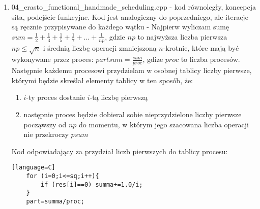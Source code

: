 \documentclass[12pt]{article}
\begin{document}
\begin {enumerate}
\begin{enumerate}
	\end{enumerate}
	\item 04\_erasto\_functional\_handmade\_scheduling.cpp - kod równoległy, koncepcja sita, podejście funkcyjne. Kod jest analogiczny do poprzedniego, ale iteracje są ręcznie przypisywane do każdego wątku - Najpierw wyliczam sumę \(sum=\frac{1}{2}+\frac{1}{3}+\frac{1}{5}+\frac{1}{7}+...+\frac{1}{np}\), gdzie \(np\) to najwyższa liczba pierwsza \(np\le\sqrt{n}\)  i średnią liczbę operacji zmniejszoną \(n\)-krotnie, które mają być wykonywane przez proces: \(partsum=\frac{sum}{proc}\), gdize \(proc\) to liczba procesów. Następnie każdemu procesowi przydzielam w osobnej tablicy liczby pierwsze, którymi będzie skreślał elementy tablicy w ten sposób, że:
	\begin{enumerate}
		\item \(i\)-ty proces dostanie \(i\)-tą liczbę pierwszą
		\item następnie proces będzie dobierał sobie nieprzydzielone liczby pierwsze począwszy od \(np\) do momentu, w którym jego szacowana liczba operacji nie przekroczy \(psum\)
	\end{enumerate}
	Kod odpowiadający za przydział liczb pierwszych do tablicy procesu:
	\begin{lstlisting}[style=mystyle, caption=  Ręczny scheduling sita funkcyjnego][language=C]
	for (i=0;i<=sq;i++){
		if (res[i]==0) summa+=1.0/i;
	}
	part=summa/proc;
	

\end{lstlisting}
\end{enumerate}
\end{document}
